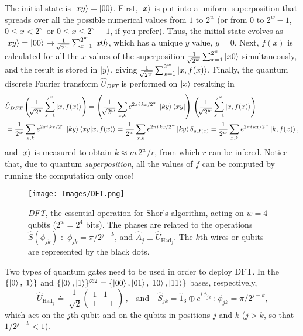 \documentclass[11pt]{article}
\numberwithin{equation}{section} %
\numberwithin{figure}{section} %
\begin{document}
\begin{appendices}
The initial state is $\ket{xy}=\ket{00}$. First, $\ket{x}$ is put into a uniform superposition that spreads over all the possible numerical values from $1$ to $2^w$ (or from $0$ to $2^w-1$, $0\leq x < 2^w$ or $0\leq x \leq 2^w-1$, if you prefer). Thus, the initial state evolves as $\ket{xy}=\ket{00}\to\frac{1}{\sqrt[]{2^w}}\sum_{x=1}^{2^w}\ket{x0}$, which has a unique $y$ value, $y=0$. Next, $f(x)$ is calculated for all the $x$ values of the superposition $\frac{1}{\sqrt[]{2^w}}\sum_{x=1}^{2^w}\ket{x0}$ simultaneously, and the result is stored in $\ket{y}$, giving $\frac{1}{\sqrt[]{2^w}}\sum_{x=1}^{2^w}\ket{x,f(x)}$. Finally, the quantum discrete Fourier transform $\hat{U}_{DFT}$  is performed on $\ket{x}$ resulting in $\,\,$ \cite[p.~12, Eq.~(4.1)]{Shor} 
\begin{equation} \label{DFT}
\begin{split}
&\hat{U}_{DFT}\left( \frac{1}{\sqrt[]{2^w}}\sum_{x=1}^{2^w}\ket{x,f(x)} \right)=\left(\frac{1}{\sqrt[]{2^w}}\sum_{x,k}e^{2\pi i\,kx/2^w}\,\ket{ky}\bra{xy}\right)\,\left( \frac{1}{\sqrt[]{2^w}}\sum_{x=1}^{2^w}\ket{x,f(x)} \right)\\
&= \frac{1}{2^w}\sum_{x,k}e^{2\pi i\,kx/2^w}\ket{ky}\braket{xy|x,f(x)} =  \frac{1}{2^w}\sum_{x,k}e^{2\pi i\,kx/2^w}\ket{ky}\delta_{y,f(x)}= \frac{1}{2^w}\sum_{x,k}e^{2\pi i\,kx/2^w}\ket{k,f(x)}\textrm{,}
\end{split}
\end{equation}
and $\ket{x}$ is measured to obtain $k\approx m\,2^w/r$, from which $r$ can be infered. Notice that, due to quantum \emph{superposition}, all the values of $f$ can be computed by running the computation only once!

\begin{figure}[H] 
	\centering
	\texttt{[image: Images/DFT.png]}
	\caption{\emph{DFT}, the essential operation for Shor's algorithm, acting on $w=4$ qubits ($2^w=2^4$ bits). The phases are related to the operations $\hat{S}(\phi_{jk})$ $:$ $\phi_{jk}=\pi/2^{j-k}$, and $\hat{A}_j\equiv\hat{U}_{\textrm{Had}_j}$. The $k$th wires or qubits are represented by the black dots.}
	  \label{fig:DTF}
\end{figure}

 Two types of quantum gates need to be used in order to deploy DFT. In the $\{\ket{0},\ket{1}\}$ and $\{\ket{0},\ket{1}\}^{\otimes 2}=\{\ket{00},\ket{01},\ket{10},\ket{11}\}$ bases, respectively,
\begin{equation}
\hat{U}_{\textrm{Had}_j} \doteq \frac{1}{\sqrt[]{2}} \begin{pmatrix}1&1\\1&-1\end{pmatrix}\,\textrm{,}\quad\textrm{and}\quad\hat{S}_{jk}=\hat{1}_3\oplus e^{i\,\phi_{jk}}\,:\,\phi_{jk}=\pi/2^{j-k}\textrm{,}
\end{equation} 
which act on the $j$th qubit and on the qubits in positions $j$ and $k$ ($j>k$, so that $1/2^{j-k}<1$). 


\end{appendices}
\end{document}
